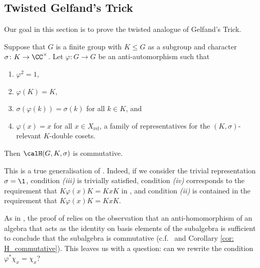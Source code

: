 
\subsection{Twisted Gelfand's Trick}\label{Section2.3}
Our goal in this section is to prove the twisted analogue of Gelfand's Trick.
\begin{thm}\label{twisted_trick}
    Suppose that $G$ is a finite group with $K\leq G$ as a subgroup and character $\sigma\colon K\to\CC^\times$.
    Let $\varphi\colon G\to G$ be an anti-automorphism such that
    \begin{enumerate}[\itshape(i)]
        \item $\varphi^2=1$,
        \item $\varphi(K)=K$,
        \item $\sigma(\varphi(k))=\sigma(k)$ for all $k\in K$, and
        \item $\varphi(x) = x$ for all $x\in X_\mathrm{rel}$, a family of representatives for the $(K,\sigma)$-relevant $K$-double cosets.
    \end{enumerate}
    Then $\calH(G,K,\sigma)$ is commutative.
\end{thm}
This is a true generalisation of .
Indeed, if we consider the trivial representation $\sigma=\1$, condition {\itshape(iii)} is trivially satisfied, condition {\itshape(iv)} corresponds to the requirement that $K\varphi(x)K=KxK$ in , and condition {\itshape(ii)} is contained in the requirement that $K\varphi(x)K=KxK$.

As in , the proof of  relies on the observation that an anti-homomorphism of an algebra that acts as the identity on basis elements of the subalgebra is sufficient to conclude that the subalgebra is commutative (c.f.\  and Corollary \ref{cor: H_commutative}).
This leaves us with a question: can we rewrite the condition $\varphi^\ast \chi_x = \chi_x$?

